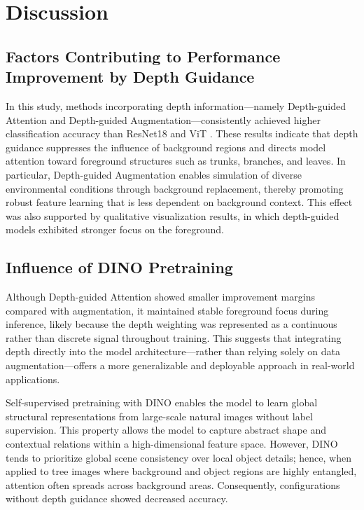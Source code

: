 \section{Discussion}

\subsection{Factors Contributing to Performance Improvement by Depth Guidance}
In this study, methods incorporating depth information—namely Depth-guided Attention and Depth-guided Augmentation—consistently achieved higher classification accuracy than ResNet18 \cite{ref12} and ViT \cite{ref1}. These results indicate that depth guidance suppresses the influence of background regions and directs model attention toward foreground structures such as trunks, branches, and leaves. In particular, Depth-guided Augmentation enables simulation of diverse environmental conditions through background replacement, thereby promoting robust feature learning that is less dependent on background context. This effect was also supported by qualitative visualization results, in which depth-guided models exhibited stronger focus on the foreground.

\subsection{Influence of DINO Pretraining}
Although Depth-guided Attention showed smaller improvement margins compared with augmentation, it maintained stable foreground focus during inference, likely because the depth weighting was represented as a continuous rather than discrete signal throughout training. This suggests that integrating depth directly into the model architecture—rather than relying solely on data augmentation—offers a more generalizable and deployable approach in real-world applications.

Self-supervised pretraining with DINO \cite{ref13} enables the model to learn global structural representations from large-scale natural images without label supervision. This property allows the model to capture abstract shape and contextual relations within a high-dimensional feature space. However, DINO tends to prioritize global scene consistency over local object details; hence, when applied to tree images where background and object regions are highly entangled, attention often spreads across background areas. Consequently, configurations without depth guidance showed decreased accuracy.

